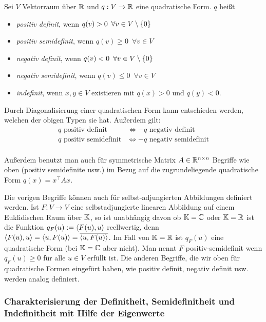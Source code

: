 Sei $ V $ Vektorraum über $ \mathbb R $ und $ q : V \to \mathbb R $ eine quadratische Form. $ q $ heißt
\begin{itemize}
	\item
		\emph{positiv definit}, wenn $ q(v) > 0 \enspace \forall v \in V \setminus \left\{ 0 \right\} $
	\item
		\emph{positiv semidefinit}, wenn $ q(v) \geq 0 \enspace \forall v \in V $
	\item
		\emph{negativ definit}, wenn $ q(v) < 0 \enspace \forall v \in V \setminus \left\{ 0 \right\} $
	\item
		\emph{negativ semidefinit}, wenn $ q(v) \leq 0 \enspace \forall v \in V $
	\item
		\emph{indefinit}, wenn $ x,y \in V $ existieren mit $ q(x) > 0 $ und $ q(y) < 0 $.
\end{itemize}
Durch Diagonalisierung einer quadratischen Form kann entschieden werden, welchen der obigen Typen sie hat. Außerdem gilt:
\begin{align*}
	q \text{ positiv definit} &\Leftrightarrow -q \text{ negativ definit} \\
	q \text{ positiv semidefinit} &\Leftrightarrow -q \text{ negativ semidefinit} \\
\end{align*}

Außerdem benutzt man auch für symmetrische Matrix $A \in \mathbb R^{n \times n}$ Begriffe wie oben (positiv semidefinite usw.) im Bezug auf die zugrundeliegende quadratische Form $q(x) = x^\top A x$. 

\begin{bem} 
	Die vorigen Begriffe können auch für selbst-adjungierten Abbildungen definiert werden. Ist $F : V \to V$ eine selbstadjungierte linearen Abbildung auf einem Euklidischen Raum über $\mathbb K$, so ist unabhängig davon ob $\mathbb K=\mathbb C$ oder $\mathbb K=\mathbb R$ ist die Funktion $q_F(u):=\left\langle  F(u),  u \right\rangle$ reellwertig, denn $\left\langle  F(u), u \right\rangle = \left\langle  u, F(u)  \right\rangle = \overline{ \left\langle  u, F(u) \right\rangle}$. Im Fall von $\mathbb K=\mathbb R$ ist $q_F(u)$ eine quadratische Form (bei $\mathbb K=\mathbb C$ aber nicht). Man nennt $F$ positiv-semidefinit wenn $q_F(u) \ge 0$ für alle $u \in V$ erfüllt ist. Die anderen Begriffe, die wir oben für quadratische Formen eingefürt haben, wie positiv definit, negativ definit usw. werden analog definiert. 
\end{bem} 

\subsubsection{Charakterisierung der Definitheit, Semidefinitheit und Indefinitheit mit Hilfe der Eigenwerte}

